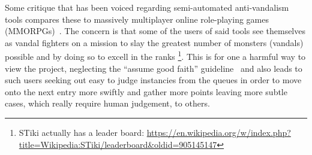Some critique that has been voiced regarding semi-automated anti-vandalism tools compares these to massively multiplayer online role-playing games (MMORPGs)~\cite{HalRied2012}.
The concern is that some of the users of said tools see themselves as vandal fighters on a mission to slay the greatest number of monsters (vandals) possible and by doing so to excell in the ranks
\footnote{STiki actually has a leader board: \url{https://en.wikipedia.org/w/index.php?title=Wikipedia:STiki/leaderboard&oldid=905145147}}.
This is for one a harmful way to view the project, neglecting the ``assume good faith'' guideline~\cite{Wikipedia:GoodFaith}
and also leads to such users seeking out easy to judge instancies from the queues in order to move onto the next entry more swiftly and gather more points
leaving more subtle cases, which really require human judgement, to others.

